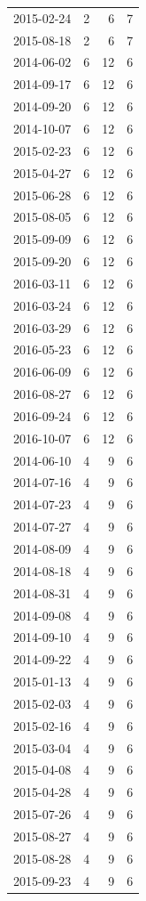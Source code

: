 \begin{tabular}{lrrr}
2015-02-24 & 2 & 6 & 7 \\
2015-08-18 & 2 & 6 & 7 \\
2014-06-02 & 6 & 12 & 6 \\
2014-09-17 & 6 & 12 & 6 \\
2014-09-20 & 6 & 12 & 6 \\
2014-10-07 & 6 & 12 & 6 \\
2015-02-23 & 6 & 12 & 6 \\
2015-04-27 & 6 & 12 & 6 \\
2015-06-28 & 6 & 12 & 6 \\
2015-08-05 & 6 & 12 & 6 \\
2015-09-09 & 6 & 12 & 6 \\
2015-09-20 & 6 & 12 & 6 \\
2016-03-11 & 6 & 12 & 6 \\
2016-03-24 & 6 & 12 & 6 \\
2016-03-29 & 6 & 12 & 6 \\
2016-05-23 & 6 & 12 & 6 \\
2016-06-09 & 6 & 12 & 6 \\
2016-08-27 & 6 & 12 & 6 \\
2016-09-24 & 6 & 12 & 6 \\
2016-10-07 & 6 & 12 & 6 \\
2014-06-10 & 4 & 9 & 6 \\
2014-07-16 & 4 & 9 & 6 \\
2014-07-23 & 4 & 9 & 6 \\
2014-07-27 & 4 & 9 & 6 \\
2014-08-09 & 4 & 9 & 6 \\
2014-08-18 & 4 & 9 & 6 \\
2014-08-31 & 4 & 9 & 6 \\
2014-09-08 & 4 & 9 & 6 \\
2014-09-10 & 4 & 9 & 6 \\
2014-09-22 & 4 & 9 & 6 \\
2015-01-13 & 4 & 9 & 6 \\
2015-02-03 & 4 & 9 & 6 \\
2015-02-16 & 4 & 9 & 6 \\
2015-03-04 & 4 & 9 & 6 \\
2015-04-08 & 4 & 9 & 6 \\
2015-04-28 & 4 & 9 & 6 \\
2015-07-26 & 4 & 9 & 6 \\
2015-08-27 & 4 & 9 & 6 \\
2015-08-28 & 4 & 9 & 6 \\
2015-09-23 & 4 & 9 & 6 \\

\end{tabular}
